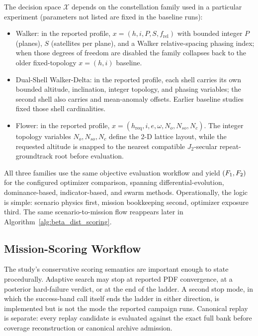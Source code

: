     The decision space $\mathcal{X}$ depends on the constellation family used in a particular experiment (parameters not listed are fixed in the baseline runs):
    \begin{itemize}[leftmargin=*]
        \item Walker: in the reported profile, $x=(h,i,P,S,f_{\mathrm{rel}})$ with bounded integer \(P\) (planes), \(S\) (satellites per plane), and a Walker relative-spacing phasing index; when those degrees of freedom are disabled the family collapses back to the older fixed-topology \(x=(h,i)\) baseline.
        \item Dual-Shell Walker-Delta: in the reported profile, each shell carries its own bounded altitude, inclination, integer topology, and phasing variables; the second shell also carries  and mean-anomaly offsets. Earlier baseline studies fixed those shell cardinalities.
        \item Flower: in the reported profile, \(x=(h_{\mathrm{req}},i,e,\omega,N_o,N_{so},N_c)\). The integer topology variables \(N_o,N_{so},N_c\) define the 2-D lattice layout, while the requested altitude is snapped to the nearest compatible \(J_2\)-secular repeat-groundtrack root before evaluation.
    \end{itemize}
    All three families use the same objective evaluation workflow and yield \((F_{1},F_{2})\) for the configured optimizer comparison, spanning differential-evolution, dominance-based, indicator-based, and swarm methods. Operationally, the logic is simple: scenario physics first, mission bookkeeping second, optimizer exposure third. The same scenario-to-mission flow reappears later in Algorithm~\ref{alg:beta_dist_scoring}.

    \subsection{Mission-Scoring Workflow}
    The study's conservative scoring semantics are important enough to state procedurally. Adaptive search may stop at reported PDF convergence, at a posterior hard-failure verdict, or at the end of the ladder. A second stop mode, in which the success-band call itself ends the ladder in either direction, is implemented but is not the mode the reported campaign runs. Canonical replay is separate: every replay candidate is evaluated against the exact full bank before coverage reconstruction or canonical archive admission.

